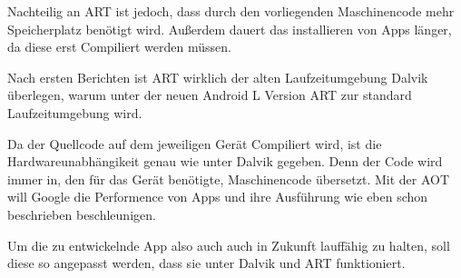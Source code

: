 Nachteilig an \ac{ART} ist jedoch, dass durch den vorliegenden Maschinencode mehr Speicherplatz ben\"otigt wird. Au\ss{}erdem dauert das installieren von Apps l\"anger, da diese erst Compiliert werden m\"ussen. \cite{NextART} \cite{AreamobileART}

Nach ersten Berichten ist \ac{ART} wirklich der alten Laufzeitumgebung Dalvik \"uberlegen, warum unter der neuen Android L Version \ac{ART} zur standard Laufzeitumgebung wird. \cite{DevART} 

Da der Quellcode auf dem jeweiligen Ger\"at Compiliert wird, ist die Hardwareunabh\"angikeit genau wie unter Dalvik gegeben. Denn der Code wird immer in, den f\"ur das Ger\"at ben\"otigte, Maschinencode \"ubersetzt. Mit der \ac{AOT} will Google die Performence von Apps und ihre Ausf\"uhrung wie eben schon beschrieben beschleunigen.

Um die zu entwickelnde App also auch auch in Zukunft lauff\"ahig zu halten, soll diese so angepasst werden, dass sie unter Dalvik und \ac{ART} funktioniert.
